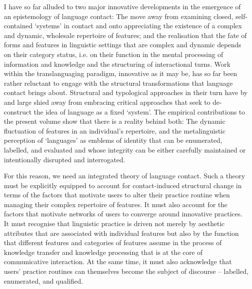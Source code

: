 \documentclass[output=paper]{langscibook}
\begin{document}
I have so far alluded to two major innovative developments in the emergence of an epistemology of language contact: The move away from examining closed, self-contained ‘systems’ in contact and onto appreciating the existence of a complex and dynamic, wholesale repertoire of features; and the realisation that the fate of forms and features in linguistic settings that are complex and dynamic depends on their category status, i.e. on their function in the mental processing of information and knowledge and the structuring of interactional turns. Work within the translanguaging paradigm, innovative as it may be, has so far been rather reluctant to engage with the structural transformations that language contact brings about. Structural and typological approaches in their turn have by and large shied away from embracing critical approaches that seek to de-construct the idea of language as a fixed ‘system’. The empirical contributions to the present volume show that there is a reality behind both: The dynamic fluctuation of features in an individual’s repertoire, and the metalinguistic perception of ‘languages’ as emblems of identity that can be enumerated, labelled, and evaluated and whose integrity can be either carefully maintained or intentionally disrupted and interrogated.

For this reason, we need an integrated theory of language contact. Such a theory must be explicitly equipped to account for contact-induced structural change in terms of the factors that motivate users to alter their practice routine when managing their complex repertoire of features. It must also account for the factors that motivate networks of users to converge around innovative practices. It must recognise that linguistic practice is driven not merely by aesthetic attributes that are associated with individual features but also by the function that different features and categories of features assume in the process of knowledge transfer and knowledge processing that is at the core of communicative interaction. At the same time, it must also acknowledge that users’ practice routines can themselves become the subject of discourse – labelled, enumerated, and qualified. 
\end{document}
